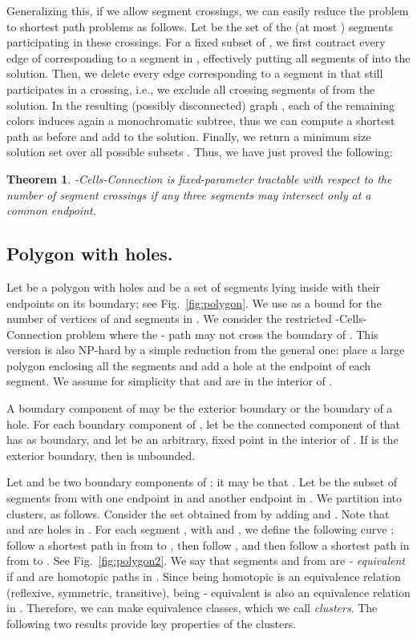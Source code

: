 \documentclass[11pt,a4paper]{article}
\newtheorem{theorem}[definition]{Theorem}
\begin{document}
Generalizing this, if we allow  segment crossings, 
we can easily reduce the problem to  shortest path problems as follows. Let  be the set of the (at most ) segments participating in these crossings. For a fixed subset  of , we first contract every edge of  corresponding to a segment in , effectively putting all segments of  into the solution. Then, we delete every edge corresponding to a segment in   that still participates in a crossing, i.e., we exclude all crossing segments of  from the solution. 
In the resulting (possibly disconnected) graph , each of the remaining colors induces again a monochromatic subtree, thus we can compute a shortest path as before and add  to the solution. Finally, we return a minimum size solution set over all  possible subsets . 
Thus, we have just proved the following:

\begin{theorem}
{\sc -Cells-Connection} is fixed-parameter tractable with respect to the number of segment crossings if any three segments may intersect only at a common endpoint.
\end{theorem}

\subsection{Polygon with holes.}
Let  be a polygon with  holes and  be a set of segments lying inside  with their endpoints on its boundary; see Fig.~\ref{fig:polygon}. We use  as a bound for the number of vertices of  and segments in . 
We consider the restricted {\sc -Cells-Connection} problem where the - path may not cross the boundary of . This version is also NP-hard by a simple reduction from the general one: place a large polygon enclosing all the segments and add a hole at the endpoint of each segment. 
We assume for simplicity that  and  are in the interior of . 

A boundary component of  may be the exterior boundary or the boundary of a hole. For each boundary component  of , let  be the connected component of  that has  as boundary, and let  be an arbitrary, fixed point in the interior of . If  is the exterior boundary, then  is unbounded.

Let  and  be two boundary components of ; it may be that . 
Let  be the subset of segments from  with one endpoint in  and another endpoint in . We partition  into clusters, as follows. Consider the set  obtained from  by adding  and . Note that  and  are holes in . For each segment , with  and , we define the following
curve : follow a shortest path in  from  to , then follow , and then follow a shortest path
in  from  to . See Fig.~\ref{fig:polygon2}.
We say that segments  and  from  are \emph{- equivalent} if  and  are homotopic paths in .
Since being homotopic is an equivalence relation (reflexive, symmetric, transitive), being - equivalent is also an equivalence relation in .
Therefore, we can make equivalence classes, which we call \emph{clusters}. 
The following two results provide key properties of the clusters. 
\end{document}
